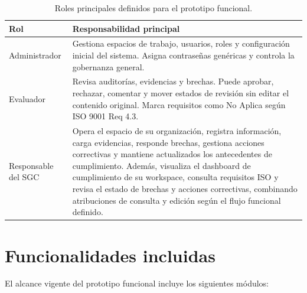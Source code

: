 \documentclass[final]{udpthesis}
\begin{document}
\begin{table}[H]
\centering
\small
\begin{tabularx}{\textwidth}{|L{3cm}|Y|}
\hline
{}\textbf{Rol} & \textbf{Responsabilidad principal} \\ \hline
Administrador & Gestiona espacios de trabajo, usuarios, roles y configuración inicial del sistema. Asigna contraseñas genéricas y controla la gobernanza general. \\ \hline
Evaluador & Revisa auditorías, evidencias y brechas. Puede aprobar, rechazar, comentar y mover estados de revisión sin editar el contenido original. Marca requisitos como No Aplica según ISO 9001 Req 4.3. \\ \hline
Responsable del SGC & Opera el espacio de su organización, registra información, carga evidencias, responde brechas, gestiona acciones correctivas y mantiene actualizados los antecedentes de cumplimiento. Además, visualiza el dashboard de cumplimiento de su workspace, consulta requisitos ISO y revisa el estado de brechas y acciones correctivas, combinando atribuciones de consulta y edición según el flujo funcional definido. \\ \hline
\end{tabularx}
\normalsize
\caption{Roles principales definidos para el prototipo funcional.}
\label{tab:roles}
\end{table}

\section{Funcionalidades incluidas}

El alcance vigente del prototipo funcional incluye los siguientes módulos:
\end{document}
